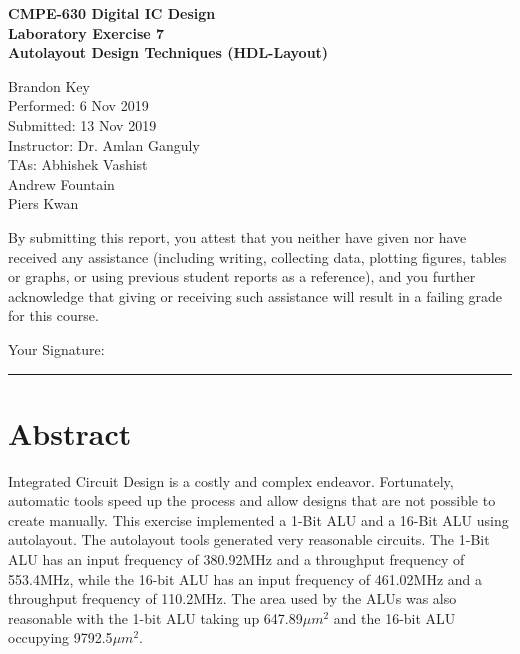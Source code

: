 \documentclass[11pt]{article}
\begin{document}
%
%

\vspace*{2 cm}

\begin{center}
\bf{CMPE-630 Digital IC Design\\
    Laboratory Exercise 7\\
\vspace{0.25 cm}
Autolayout Design Techniques (HDL-Layout)
}
\end{center}

\vspace{6 cm}

\begin{flushright}
Brandon Key\\
Performed: 6 Nov 2019\\
Submitted: 13 Nov 2019\\
\vspace{0.5 cm}
Instructor: Dr. Amlan Ganguly\\
TAs: Abhishek Vashist\\
Andrew Fountain\\
Piers Kwan\\
\vspace{0.5 cm}
\end{flushright}

\vspace{3 cm}
\indent By submitting this report, you attest that you neither have given nor have received any assistance (including writing, collecting data, plotting figures, tables or graphs, or using previous student reports as a reference), and you further acknowledge that giving or receiving such assistance will result in a failing grade for this course.

\vspace{1 cm}
Your Signature:   \rule{13cm}{.1pt}


\tableofcontents
\newpage

\section{Abstract}

	Integrated Circuit Design is a costly and complex endeavor. Fortunately, automatic tools speed up the process and allow designs that are not possible to create manually. This exercise implemented a 1-Bit ALU and a 16-Bit ALU using autolayout. The autolayout tools generated very reasonable circuits. The 1-Bit ALU has an input frequency of 380.92MHz and a throughput frequency of 553.4MHz, while the 16-bit ALU has an input frequency of 461.02MHz and a throughput frequency of 110.2MHz. The area used by the ALUs was also reasonable with the 1-bit ALU taking up 647.89$\mu m^2$ and the 16-bit ALU occupying 9792.5$\mu m^2$.
	
\end{document}
